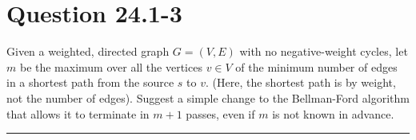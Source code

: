 \documentclass[20pt]{article} %
\begin{document}
\section{Question 24.1-3} 
Given a weighted, directed graph $G = (V, E)$ with no negative-weight cycles, let $m$ be the maximum over all the vertices $v \in V$ of the minimum  number of edges in a shortest path from the source $s$ to $v$.  (Here, the shortest path is by weight, not the number of edges). Suggest a simple change to the Bellman-Ford algorithm that allows it to terminate in $m + 1$ passes, even if $m$ is not known in advance. \\
\noindent\rule{2cm}{0.4pt} \\
\end{document}
